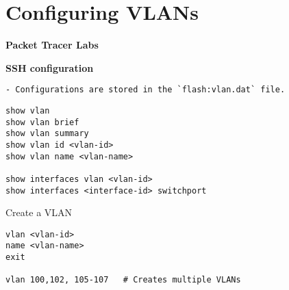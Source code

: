 \documentclass[../EngineeringJournal_CDavis.tex]{subfiles}
\begin{document}

\chapter*{Configuring \linebreak[1] VLANs \hspace*{\fill}{2020}}
\noindent\textbf{{Packet Tracer Labs} }                             



\hspace{0.2cm}
\begin{tcolorbox}[width=6.3in]
{\bf{SSH configuration}}
\scriptsize
\begin{verbatim}
- Configurations are stored in the `flash:vlan.dat` file.
\end{verbatim}
\end{tcolorbox}



\hspace{0.2cm}
\begin{tcolorbox}[width=6.3in]
\scriptsize 
\begin{verbatim}
show vlan
show vlan brief
show vlan summary
show vlan id <vlan-id>
show vlan name <vlan-name>

show interfaces vlan <vlan-id>
show interfaces <interface-id> switchport
\end{verbatim}
\end{tcolorbox}
\hspace{0.2cm}
\normalsize  


\hspace{0.2cm}
\begin{tcolorbox}[width=6.3in]
Create a VLAN
\scriptsize 
\begin{verbatim}
vlan <vlan-id>
name <vlan-name>
exit

vlan 100,102, 105-107	# Creates multiple VLANs
\end{verbatim}
\end{tcolorbox}
\hspace{0.2cm}
\normalsize  
\end{document}
